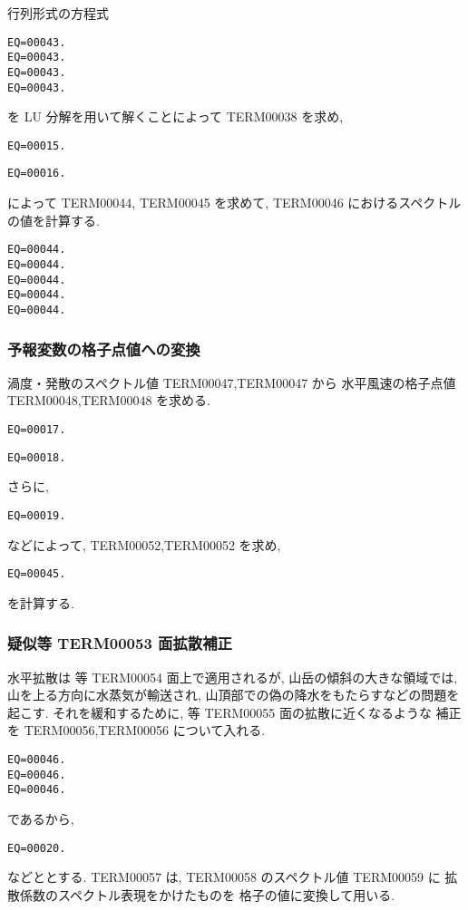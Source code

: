 行列形式の方程式
\begin{verbatim}
EQ=00043.
EQ=00043.
EQ=00043.
EQ=00043.
\end{verbatim}
%
を LU 分解を用いて解くことによって 
TERM00038 を求め,
%
\begin{verbatim}
EQ=00015.
\end{verbatim}
%
\begin{verbatim}
EQ=00016.
\end{verbatim}

%
によって
TERM00044,
TERM00045 
を求めて, TERM00046 におけるスペクトルの値を計算する.
\begin{verbatim}
EQ=00044.
EQ=00044.
EQ=00044.
EQ=00044.
EQ=00044.
\end{verbatim}

\subsubsection{予報変数の格子点値への変換}


渦度・発散のスペクトル値 TERM00047,TERM00047 から
水平風速の格子点値 TERM00048,TERM00048 を求める.
\begin{verbatim}
EQ=00017.
\end{verbatim}
%
\begin{verbatim}
EQ=00018.
\end{verbatim}

さらに,
\begin{verbatim}
EQ=00019.
\end{verbatim}
などによって, TERM00052,TERM00052 を求め,
\begin{verbatim}
EQ=00045.
\end{verbatim}
を計算する.

\subsubsection{疑似等 TERM00053 面拡散補正}

水平拡散は 等 TERM00054 面上で適用されるが,
山岳の傾斜の大きな領域では, 山を上る方向に水蒸気が輸送され,
山頂部での偽の降水をもたらすなどの問題を起こす.
それを緩和するために, 等 TERM00055 面の拡散に近くなるような
補正を TERM00056,TERM00056 について入れる.

\begin{verbatim}
EQ=00046.
EQ=00046.
EQ=00046.
\end{verbatim}
%
であるから,
\begin{verbatim}
EQ=00020.
\end{verbatim}
などととする.
TERM00057 は, TERM00058 のスペクトル値 TERM00059 に
拡散係数のスペクトル表現をかけたものを
格子の値に変換して用いる.


